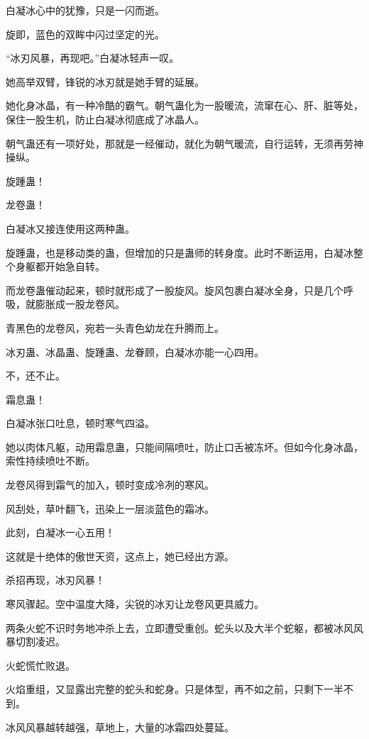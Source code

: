 
\begin{this_body}

白凝冰心中的犹豫，只是一闪而逝。

旋即，蓝色的双眸中闪过坚定的光。

“冰刃风暴，再现吧。”白凝冰轻声一叹。

她高举双臂，锋锐的冰刃就是她手臂的延展。

她化身冰晶，有一种冷酷的霸气。朝气蛊化为一股暖流，流窜在心、肝、脏等处，保住一股生机，防止白凝冰彻底成了冰晶人。

朝气蛊还有一项好处，那就是一经催动，就化为朝气暖流，自行运转，无须再劳神操纵。

旋踵蛊！

龙卷蛊！

白凝冰又接连使用这两种蛊。

旋踵蛊，也是移动类的蛊，但增加的只是蛊师的转身度。此时不断运用，白凝冰整个身躯都开始急自转。

而龙卷蛊催动起来，顿时就形成了一股旋风。旋风包裹白凝冰全身，只是几个呼吸，就膨胀成一股龙卷风。

青黑色的龙卷风，宛若一头青色幼龙在升腾而上。

冰刃蛊、冰晶蛊、旋踵蛊、龙眷顾，白凝冰亦能一心四用。

不，还不止。

霜息蛊！

白凝冰张口吐息，顿时寒气四溢。

她以肉体凡躯，动用霜息蛊，只能间隔喷吐，防止口舌被冻坏。但如今化身冰晶，索性持续喷吐不断。

龙卷风得到霜气的加入，顿时变成冷冽的寒风。

风刮处，草叶翻飞，迅染上一层淡蓝色的霜冰。

此刻，白凝冰一心五用！

这就是十绝体的傲世天资，这点上，她已经出方源。

杀招再现，冰刃风暴！

寒风骤起。空中温度大降，尖锐的冰刃让龙卷风更具威力。

两条火蛇不识时务地冲杀上去，立即遭受重创。蛇头以及大半个蛇躯，都被冰风风暴切割凌迟。

火蛇慌忙败退。

火焰重组，又显露出完整的蛇头和蛇身。只是体型，再不如之前，只剩下一半不到。

冰风风暴越转越强，草地上，大量的冰霜四处蔓延。


\end{this_body}
